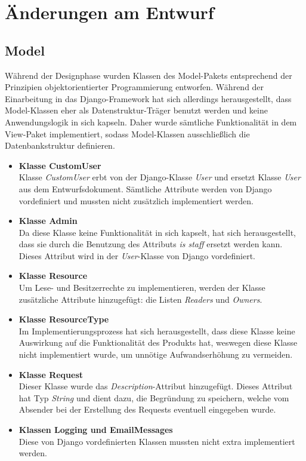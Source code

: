 \documentclass[parskip=full,11pt]{scrartcl}
\begin{document}
 \newpage
 \section{Änderungen am Entwurf}
 
 \subsection{Model}
Während der Designphase wurden Klassen des Model-Pakets entsprechend der Prinzipien objektorientierter Programmierung entworfen. Während der Einarbeitung in das Django-Framework hat sich allerdings herausgestellt, dass Model-Klassen eher als Datenstruktur-Träger benutzt werden und keine Anwendungslogik in sich kapseln. Daher wurde sämtliche Funktionalität in dem View-Paket implementiert, sodass Model-Klassen ausschließlich die Datenbankstruktur definieren.
 
\begin{itemize}
\item \textbf{Klasse CustomUser}\\
Klasse \textit{CustomUser} erbt von der Django-Klasse \textit{User} und ersetzt Klasse \textit{User} aus dem Entwurfsdokument. Sämtliche Attribute werden von Django vordefiniert und mussten nicht zusätzlich implementiert werden.

\item \textbf{Klasse Admin}\\
Da diese Klasse keine Funktionalität in sich kapselt, hat sich herausgestellt, dass sie durch die Benutzung des Attributs \textit{is staff} ersetzt werden kann. Dieses Attribut wird in der \textit{User}-Klasse von Django vordefiniert.
 
\item\textbf{Klasse Resource}\\
Um Lese- und Besitzerrechte zu implementieren, werden der Klasse zusätzliche Attribute hinzugefügt: die Listen \textit{Readers} und \textit{Owners}.

\item \textbf{Klasse ResourceType}\\
Im Implementierungsprozess hat sich herausgestellt, dass diese Klasse keine Auswirkung auf die Funktionalität des Produkts hat, weswegen diese Klasse nicht implementiert wurde, um unnötige Aufwandserhöhung zu vermeiden.

\item \textbf{Klasse Request}\\
Dieser Klasse wurde das \textit{Description}-Attribut hinzugefügt. Dieses Attribut hat Typ \textit{String} und dient dazu, die Begründung zu speichern, welche vom Absender bei der Erstellung des Requests eventuell eingegeben wurde.

\item \textbf{Klassen Logging und EmailMessages}\\
Diese von Django vordefinierten Klassen mussten nicht extra implementiert werden. 
\end{itemize}
\end{document}
